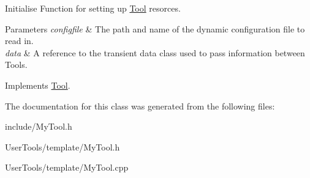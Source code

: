 Initialise Function for setting up \hyperlink{classTool}{Tool} resorces. 


\begin{DoxyParams}{Parameters}
{\em configfile} & The path and name of the dynamic configuration file to read in. \\
\hline
{\em data} & A reference to the transient data class used to pass information between Tools. \\
\hline
\end{DoxyParams}


Implements \hyperlink{classTool_a4b04a99172dfe09dc97927d1feaff0ce}{Tool}.



The documentation for this class was generated from the following files\-:\begin{DoxyCompactItemize}
\item 
include/My\-Tool.\-h\item 
User\-Tools/template/My\-Tool.\-h\item 
User\-Tools/template/My\-Tool.\-cpp\end{DoxyCompactItemize}

